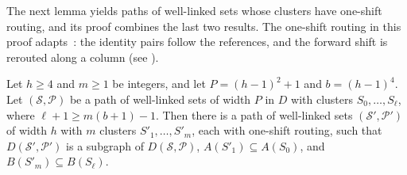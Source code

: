 \documentclass[fontsize=12pt,leading=14pt]{fullpaper}
\newcommand{\Pcal}{\mathcal{P}}
\newcommand{\Scal}{\mathcal{S}}
\begin{document}
The next lemma yields paths of well-linked sets whose clusters have one-shift routing, and its proof combines the last two results.
The one-shift routing in this proof adapts~\cite[Lemma~7.6]{HKMM26a}: the identity pairs follow the references, and the forward shift is rerouted along a column (see ).

\begin{lemma}\label{lem:s3-clean-columns}
  Let $h\ge4$ and $m\ge1$ be integers, and let $P=(h-1)^2+1$ and $b=(h-1)^4$.
  Let $(\Scal,\Pcal)$ be a path of well-linked sets of width $P$ in $D$ with clusters $S_0,\dots,S_\ell$, where $\ell+1\ge m(b+1)-1$.
  Then there is a path of well-linked sets $(\Scal',\Pcal')$ of width $h$ with $m$ clusters $S'_1,\dots,S'_m$, each with one-shift routing, such that $D(\Scal',\Pcal')$ is a subgraph of $D(\Scal,\Pcal)$, $A(S'_1)\subseteq A(S_0)$, and $B(S'_m)\subseteq B(S_\ell)$.
\end{lemma}
\end{document}
